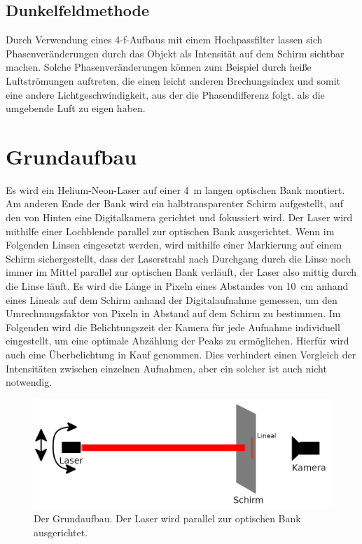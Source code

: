 \documentclass[
	a4paper,
	12pt,
	pagesize,
	ngerman
]{scrartcl}
\begin{document}
	\subsection{Dunkelfeldmethode}
	\label{sec_dunkel}

	Durch Verwendung eines 4-f-Aufbaus mit einem Hochpassfilter lassen sich Phasenveränderungen durch das Objekt als Intensität auf dem Schirm sichtbar machen.
	Solche Phasenveränderungen können zum Beispiel durch heiße Luftströmungen auftreten, die einen leicht anderen Brechungsindex und somit eine andere Lichtgeschwindigkeit, aus der die Phasendifferenz folgt, als die umgebende Luft zu eigen haben.

	\section{Grundaufbau}
	Es wird ein Helium-Neon-Laser auf einer \SI{4}{m} langen optischen Bank montiert.
	Am anderen Ende der Bank wird ein halbtransparenter Schirm aufgestellt, auf den von Hinten eine Digitalkamera gerichtet und fokussiert wird.
	Der Laser wird mithilfe einer Lochblende parallel zur optischen Bank ausgerichtet.
	Wenn im Folgenden Linsen eingesetzt werden, wird mithilfe einer Markierung auf einem Schirm sichergestellt, dass der Laserstrahl nach Durchgang durch die Linse noch immer im Mittel parallel zur optischen Bank verläuft, der Laser also mittig durch die Linse läuft. %
	Es wird die Länge in Pixeln eines Abstandes von \SI{10}{cm} anhand eines Lineals auf dem Schirm anhand der Digitalaufnahme gemessen, um den Umrechnungsfaktor von Pixeln in Abstand auf dem Schirm zu bestimmen.
	Im Folgenden wird die Belichtungszeit der Kamera für jede Aufnahme individuell eingestellt, um eine optimale Abzählung der Peaks zu ermöglichen.
	Hierfür wird auch eine Überbelichtung in Kauf genommen.
	Dies verhindert einen Vergleich der Intensitäten zwischen einzelnen Aufnahmen, aber ein solcher ist auch nicht notwendig.

	\begin{figure}[H]
			\includegraphics[width=1\linewidth]{img/grundaufbau}
			\caption{
				Der Grundaufbau. Der Laser wird parallel zur optischen Bank ausgerichtet.
			}
			\label{fig_grundaufbau}
	\end{figure}
\end{document}
